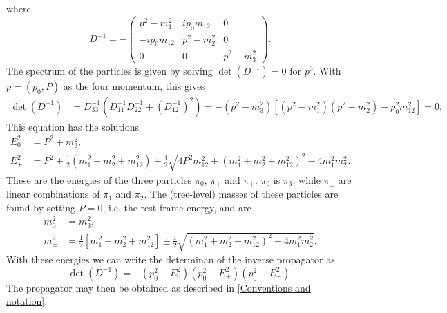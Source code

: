 where
\begin{equation*}
    D^{-1} = -
    \begin{pmatrix}
        p^2 - m^2_1             & i p_0 m_{12}     & 0             \\
        - i p_0 m_{12}            & p^2 - m^2_2       & 0             \\
        0                       & 0                 & p^2 - m^2_3
    \end{pmatrix}.
\end{equation*}
The spectrum of the particles is given by solving $\det(D^{-1}) = 0$ for $p^0$. With $p = (p_0, P)$ as the four momentum, this gives
\begin{align*}
    \det(D^{-1}) & = D^{-1}_{33} \left(D^{-1}_{11} D^{-1}_{22} + (D^{-1}_{12})^2\right)
    = - \left(p^2 - m^2_3\right)
    \left[
        \left(p^2 - m^2_1\right)
        \left(p^2 - m^2_2\right)
        - p_0^2 m_{12}^2
    \right] = 0,
\end{align*}
This equation has the solutions
\begin{align}
    E_0^2 &= P^2 + m_3^2, \\
    E_\pm^2
    & = P^2 +
    \frac{1}{2}
    \left(
        m_1^2 + m_2^2 + m_{12}^2 
    \right)
    \pm 
    \frac{1}{2}
    \sqrt{
        4P^2m_{12}^2 
        +
        \left(
            m_1^2 + m_2^2 + m_{12}^2
        \right)^2
        - 4 m_1^2 m_2^2
    }.
\end{align}
These are the energies of the three particles $\pi_0$, $\pi_+$ and $\pi_+$.
$\pi_0$ is $\pi_3$, while $\pi_\pm$ are linear combinations of $\pi_1$ and $\pi_2$.
The (tree-level) masses of these particles are found by setting $P = 0$, i.e. the rest-frame energy, and are
\begin{align}
    m_0^2 &= m_3^2, \\
    m_\pm^2
    & =  \frac{1}{2}
    \left[
        m_1^2 + m_2^2 + m_{12}^2 
    \right]
    \pm \frac{1}{2}
    \sqrt{
        \left(
            m_1^2 + m_2^2 + m_{12}^2
        \right)^2
        - 4 m_1^2 m_2^2
    }.
\end{align}
With these energies we can write the determinan of the inverse propagator as
\begin{equation}
    \det(D^{-1}) = - (p_0^2 - E_0^2) (p_0^2 - E_+^2) (p_0^2 - E_-^2).
\end{equation}
The propagator may then be obtained as described in \autoref{Conventions and notation},
